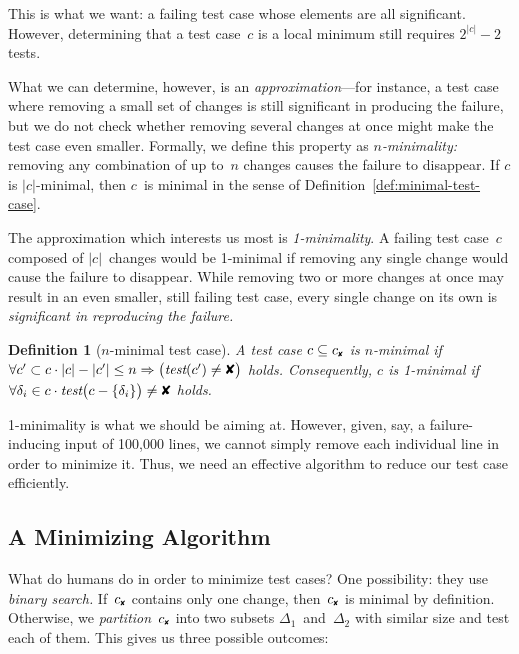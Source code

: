 \documentclass{acm_proc_article-sp}
\newcommand{\FAIL}{\text{\ding{56}}\xspace}
\newcommand{\cfail}{{c_{\scriptscriptstyle \FAIL}}}
\newcommand{\test}{\textit{test}\xspace}
\theoremstyle{plain}
\newtheorem{definition}{Definition}
\begin{document}
\noindent
This is what we want: a failing test case whose elements are all
significant.  However, determining that a test case~$c$ is a local
minimum still requires $2^{|c|} - 2$ tests.

What we can determine, however, is an \emph{approximation}---for
instance, a test case where removing a small set of changes is still
significant in producing the failure, but we do not check whether
removing several changes at once might make the test case even
smaller.  Formally, we define this property as \emph{$n$-minimality:}
removing any combination of up to~$n$ changes causes the failure to
disappear.  If $c$ is $|c|$-minimal, then $c$~is minimal in the sense
of Definition~\ref{def:minimal-test-case}.

The approximation which interests us most is \emph{1-minimality}.  A
failing test case~$c$ composed of $|c|$~changes would be 1-minimal if
removing any single change would cause the failure to disappear.
While removing two or more changes at once may result in an even
smaller, still failing test case, every single change on its own is
\emph{significant in reproducing the failure.}

\begin{definition}[$n$-minimal test case]
\label{def:n-minimal-test-case}
A test case $c \subseteq \cfail$ is \emph{$n$-minimal} if\:
$
\forall c' \subset c \cdot |c| - |c'| \leq n \Rightarrow \bigl(\test(c') \neq \FAIL\bigr)
$
holds.  Consequently, $c$ is \emph{1-minimal} if\:
$
\forall \delta_i \in c \cdot \test\bigl(c - \{\delta_i\}\bigr) \neq \FAIL
$
holds.
\end{definition}

1-minimality is what we should be aiming at.  However, given, say, a
failure-inducing input of 100,000 lines, we cannot simply remove each
individual line in order to minimize it.  Thus, we need an effective
algorithm to reduce our test case efficiently.


\subsection{A Minimizing Algorithm}
\label{sec:ddmin}

\noindent
What do humans do in order to minimize test cases?  One possibility:
they use \emph{binary search.}  If~$\cfail$ contains only one change,
then~$\cfail$ is minimal by definition.  Otherwise, we
\emph{partition}~$\cfail$ into two subsets $\Delta_1$~and~$\Delta_2$ with
similar size and test each of them.  This gives us three possible
outcomes:
\end{document}
